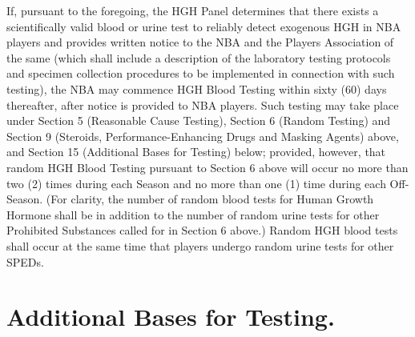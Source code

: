 \documentclass[
]{book}
\begin{document}
\begin{enumerate}
  If, pursuant to the foregoing, the HGH Panel determines that there exists a scientifically valid blood or urine test to reliably detect exogenous HGH in NBA players and provides written notice to the NBA and the Players Association of the same (which shall include a description of the laboratory testing protocols and specimen collection procedures to be implemented in connection with such testing), the NBA may commence HGH Blood Testing within sixty (60) days thereafter, after notice is provided to NBA players. Such testing may take place under Section 5 (Reasonable Cause Testing), Section 6 (Random Testing) and Section 9 (Steroids, Performance-Enhancing Drugs and Masking Agents) above, and Section 15 (Additional Bases for Testing) below; provided, however, that random HGH Blood Testing pursuant to Section 6 above will occur no more than two (2) times during each Season and no more than one (1) time during each Off-Season. (For clarity, the number of random blood tests for Human Growth Hormone shall be in addition to the number of random urine tests for other Prohibited Substances called for in Section 6 above.) Random HGH blood tests shall occur at the same time that players undergo random urine tests for other SPEDs.
\end{enumerate}

\hypertarget{additional-bases-for-testing.}{%
\section{Additional Bases for Testing.}\label{additional-bases-for-testing.}}
\end{document}
